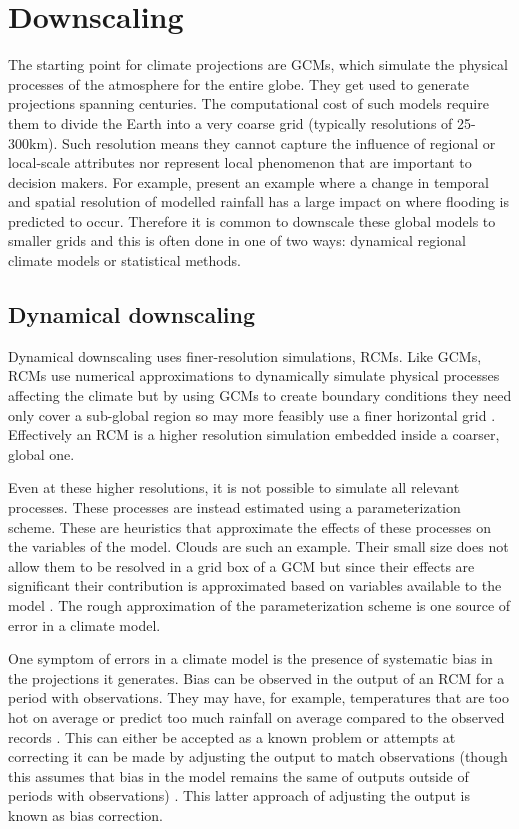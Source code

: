 \section{Downscaling} \label{sec:downscalingbg}

The starting point for climate projections are GCMs, which simulate the physical processes of the atmosphere for the entire globe. They get used to generate projections spanning centuries. The computational cost of such models require them to divide the Earth into a very coarse grid (typically resolutions of 25-300km). Such resolution means they cannot capture the influence of regional or local-scale attributes nor represent local phenomenon that are important to decision makers. For example, \textcite{scahller2020resolutionrole} present an example where a change in temporal and spatial resolution of modelled rainfall has a large impact on where flooding is predicted to occur. Therefore it is common to downscale these global models to smaller grids and this is often done in one of two ways: dynamical regional climate models or statistical methods.

\subsection{Dynamical downscaling} \label{sec:downscalingbg:dynamical}

Dynamical downscaling uses finer-resolution simulations, RCMs. Like GCMs, RCMs use numerical approximations to dynamically simulate physical processes affecting the climate but by using GCMs to create boundary conditions they need only cover a sub-global region so may more feasibly use a finer horizontal grid \cite{tapiador2020rcmreview}. Effectively an RCM is a higher resolution simulation embedded inside a coarser, global one.

Even at these higher resolutions, it is not possible to simulate all relevant processes. These processes are instead estimated using a parameterization scheme. These are heuristics that approximate the effects of these processes on the variables of the model. Clouds are such an example. Their small size does not allow them to be resolved in a grid box of a GCM but since their effects are significant their contribution is approximated based on variables available to the model \cite{rasp2018dlsubgridclimmodel}. The rough approximation of the parameterization scheme is one source of error in a climate model.

One symptom of errors in a climate model is the presence of systematic bias in the projections it generates. Bias can be observed in the output of an RCM for a period with observations. They may have, for example, temperatures that are too hot on average or predict too much rainfall on average compared to the observed records \cite{christensen2008rcmbiascorrection}. This can either be accepted as a known problem or attempts at correcting it can be made by adjusting the output to match observations (though this assumes that bias in the model remains the same of outputs outside of periods with observations) \cite{tapiador2020rcmreview}. This latter approach of adjusting the output is known as bias correction.

